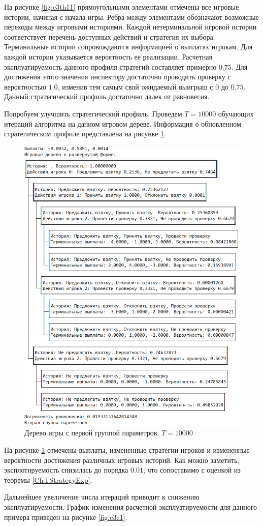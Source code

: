 \par
На рисунке \ref{fig:c3th11} прямоугольными элементами отмечены все игровые истории, начиная с начала игры. Ребра между элементами обозначают возможные переходы между игровыми историями. Каждой нетерминальной игровой истории соответствует перечень доступных действий и стратегия их выбора. Терминальные истории сопровождаются информацией о выплатах игрокам. Для каждой истории указывается вероятность ее реализации. Расчетная эксплуатируемость данного профиля стратегий составляет примерно $0.75$. Для достижения этого значения инспектору достаточно проводить проверку с вероятностью $1.0$, изменив тем самым свой ожидаемый выигрыш с $0$ до $0.75$. Данный стратегический профиль достаточно далек от равновесия.
\par
Попробуем улучшить стратегический профиль. Проведем $T=10000$ обучающих итераций алгоритма на данном игровом дереве. Информация о обновленном стратегическом профиле представлена на рисунке \ref{fig:c3th12}.
\begin{figure}[H]
	\centering
	\includegraphics[width=0.9\linewidth]{inc/img/c3th12}
	\caption{Дерево игры с первой группой параметров. $T = 10000$}
	\label{fig:c3th12}
\end{figure}
\par
На рисунке \ref{fig:c3th12} отмечены выплаты, измененные стратегии игроков и измененные вероятности достижения различных игровых историй. Как можно заметить, эксплотируемость снизилась до порядка $0.01$, что сопоставимо с оценкой из теоремы \ref{CfrTStrategyExp}.
\par
Дальнейшее увеличение числа итераций приводит к снижению эксплуатируемости. График изменения расчетной эксплуатируемости для данного примера приведен на рисунке \ref{fig:c3e1}.

